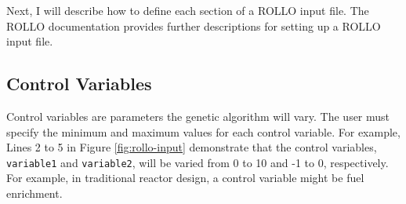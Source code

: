 Next, I will describe how to define each section of a \gls{ROLLO} input file. 
The \gls{ROLLO} documentation \cite{chee_documentation_2021} provides further 
descriptions for setting up a \gls{ROLLO} input file.

\subsection{Control Variables}
Control variables are parameters the genetic algorithm will vary. 
The user must specify the minimum and maximum values for each control variable.
For example, Lines 2 to 5 in Figure \ref{fig:rollo-input} demonstrate that the 
control variables, \texttt{variable1} and \texttt{variable2}, 
will be varied from 0 to 10 and -1 to 0, respectively. 
For example, in traditional reactor design, a control variable might be fuel 
enrichment. 

